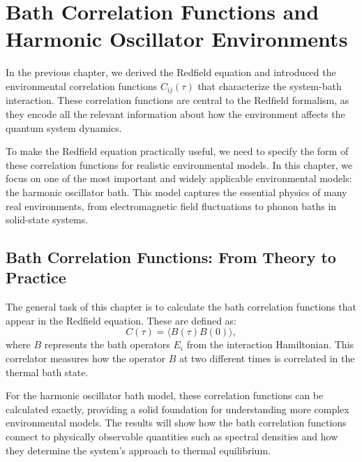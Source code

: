 \chapter{Bath Correlation Functions and Harmonic Oscillator Environments} %

\label{chapter_bath_correlations_harmonic_oscillators} %

In the previous chapter, we derived the Redfield equation and introduced the environmental correlation functions $C_{ij}(\tau)$ that characterize the system-bath interaction. These correlation functions are central to the Redfield formalism, as they encode all the relevant information about how the environment affects the quantum system dynamics.

To make the Redfield equation practically useful, we need to specify the form of these correlation functions for realistic environmental models. In this chapter, we focus on one of the most important and widely applicable environmental models: the harmonic oscillator bath. This model captures the essential physics of many real environments, from electromagnetic field fluctuations to phonon baths in solid-state systems.


\section{Bath Correlation Functions: From Theory to Practice}
\label{sec:bath_correlator}

The general task of this chapter is to calculate the bath correlation functions that appear in the Redfield equation. These are defined as:
\begin{equation} \label{eq:bath_correlator}
	C(\tau) = \langle B(\tau) B(0) \rangle,
\end{equation}
where \( B \) represents the bath operators $E_i$ from the interaction Hamiltonian. This correlator measures how the operator \( B \) at two different times is correlated in the thermal bath state.

For the harmonic oscillator bath model, these correlation functions can be calculated exactly, providing a solid foundation for understanding more complex environmental models. The results will show how the bath correlation functions connect to physically observable quantities such as spectral densities and how they determine the system's approach to thermal equilibrium.

